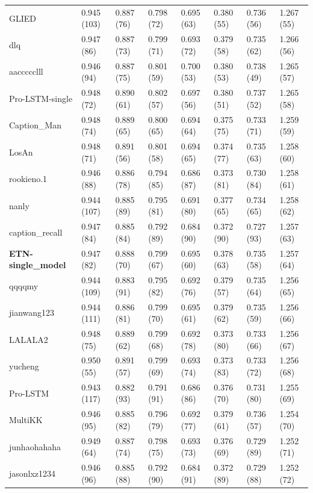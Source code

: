 \documentclass[english,twoside,openright]{HYgraduMLDS}
\begin{document}
\begin{appendices}
\begin{longtable}{l|l|l|l|l|l|l|l}
GLIED & 0.945 (103) & 0.887 (76) & 0.798 (72) & 0.695 (63) & 0.380 (55) & 0.736 (56) & 1.267 (55) \\
dlq & 0.947 (86) & 0.887 (73) & 0.799 (71) & 0.693 (72) & 0.379 (58) & 0.735 (62) & 1.266 (56) \\
aaccccclll & 0.946 (94) & 0.887 (75) & 0.801 (59) & 0.700 (53) & 0.380 (53) & 0.738 (49) & 1.265 (57) \\
Pro-LSTM-single & 0.948 (72) & 0.890 (61) & 0.802 (57) & 0.697 (56) & 0.380 (51) & 0.737 (52) & 1.265 (58) \\
Caption\_Man & 0.948 (74) & 0.889 (65) & 0.800 (65) & 0.694 (64) & 0.375 (75) & 0.733 (71) & 1.259 (59) \\
LosAn & 0.948 (71) & 0.891 (56) & 0.801 (58) & 0.694 (65) & 0.374 (77) & 0.735 (63) & 1.258 (60) \\
rookieno.1 & 0.946 (88) & 0.886 (78) & 0.794 (85) & 0.686 (87) & 0.373 (81) & 0.730 (84) & 1.258 (61) \\
nanly & 0.944 (107) & 0.885 (89) & 0.795 (81) & 0.691 (80) & 0.377 (65) & 0.734 (65) & 1.258 (62) \\
caption\_recall & 0.947 (84) & 0.885 (84) & 0.792 (89) & 0.684 (90) & 0.372 (90) & 0.727 (93) & 1.257 (63) \\
\textbf{ETN-single\_model} & 0.947 (82) & 0.888 (70) & 0.799 (67) & 0.695 (60) & 0.378 (63) & 0.735 (58) & 1.257 (64) \\
qqqqmy & 0.944 (109) & 0.883 (91) & 0.795 (82) & 0.692 (76) & 0.379 (57) & 0.735 (64) & 1.256 (65) \\
jianwang123 & 0.944 (111) & 0.886 (81) & 0.799 (70) & 0.695 (61) & 0.379 (62) & 0.735 (59) & 1.256 (66) \\
LALALA2 & 0.948 (75) & 0.889 (62) & 0.799 (68) & 0.692 (78) & 0.373 (80) & 0.733 (66) & 1.256 (67) \\
yucheng & 0.950 (55) & 0.891 (57) & 0.799 (69) & 0.693 (74) & 0.373 (83) & 0.733 (72) & 1.256 (68) \\
Pro-LSTM & 0.943 (117) & 0.882 (93) & 0.791 (91) & 0.686 (86) & 0.376 (70) & 0.731 (80) & 1.255 (69) \\
MultiKK & 0.946 (95) & 0.885 (82) & 0.796 (79) & 0.692 (77) & 0.379 (61) & 0.736 (57) & 1.254 (70) \\
junhaohahaha & 0.949 (64) & 0.887 (74) & 0.798 (75) & 0.693 (73) & 0.376 (69) & 0.729 (89) & 1.252 (71) \\
jasonlxz1234 & 0.946 (96) & 0.885 (88) & 0.792 (90) & 0.684 (91) & 0.372 (89) & 0.729 (88) & 1.252 (72) \\

\end{longtable}
\end{appendices}
\end{document}
